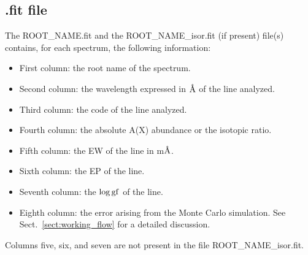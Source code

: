 \documentclass[modern]{aastex701}
\newcommand{\angstrom}{\mbox{\normalfont\AA}}
\begin{document}
\subsection{.fit file} \label{sect:fit_file}
The ROOT\_NAME.fit and the ROOT\_NAME\_isor.fit (if present) file(s) contains, for each spectrum, the following information:
\begin{itemize}
    \item First column: the root name of the spectrum.
    \item Second column: the wavelength expressed in $\angstrom$ of the line analyzed.
    \item Third column: the code of the line analyzed.
    \item Fourth column: the absolute A(X) abundance or the isotopic ratio. 
    \item Fifth column: the EW of the line in m$\angstrom$.
    \item Sixth column: the EP of the line.
    \item Seventh column: the $\rm \log gf$ of the line.
    \item Eighth column: the error arising from the Monte Carlo simulation. See Sect.~\ref{sect:working_flow} for a detailed discussion. 
\end{itemize}

Columns five, six, and seven are not present in the file ROOT\_NAME\_isor.fit.
\end{document}
